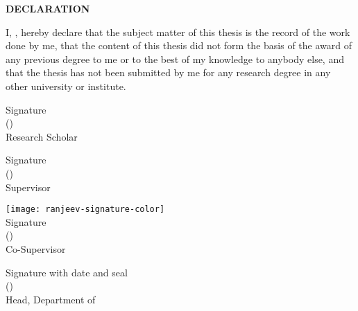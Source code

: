 \begin{titlepage}
    \begin{center}
        {\bf \LARGE DECLARATION}
    \end{center}

    \par
    I, \textit{\authorname}, hereby declare that the subject matter of this thesis is the record of the work done by me, that the content of this thesis did not form the basis of the award of any previous degree to me or to the best of my knowledge to anybody else, and that the thesis has not been submitted by me for any research degree in any other university or institute.
    
    \vspace*{15mm}
    \begin{flushleft}
        Signature\\
        (\authorname)\\
        Research Scholar
    \end{flushleft}
    
    \vspace*{15mm}
    \begin{flushleft}
        Signature\\
        (\supervisor)\\
        Supervisor
    \end{flushleft}
    
    \vspace*{5mm}
    \begin{flushleft}
    	\texttt{[image: ranjeev-signature-color]}\vspace{-3mm}\\
        Signature\\
        (\cosupervisor)\\
        Co-Supervisor
    \end{flushleft}
    
    \vspace*{15mm}
    \begin{flushleft}
        Signature with date and seal\\
        (\headofdepartment)\\
        Head, Department of \department
    \end{flushleft}

\end{titlepage}